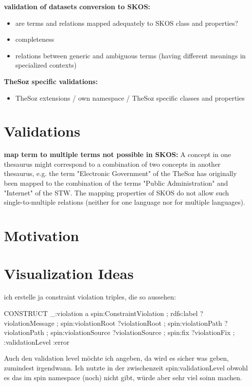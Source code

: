 \documentclass{llncs}
\begin{document}
\textbf{validation of datasets conversion to SKOS:}
\begin{itemize}
	\item are terms and relations mapped adequately to SKOS class and properties? 
	\item completeness
	\item relations between generic and ambiguous terms (having different meanings in specialized contexts) 
\end{itemize}

\textbf{TheSoz specific validations:}
\begin{itemize}
	\item TheSoz extensions / own namespace / TheSoz specific classes and properties
\end{itemize}

\section{Validations}

\textbf{map term to multiple terms not possible in SKOS:}
A concept in one thesaurus
might correspond to a combination of two concepts in
another thesaurus, e.g. the term "Electronic Government" of the TheSoz has originally been mapped to
the combination of the terms "Public Administration"
and "Internet" of the STW. The mapping properties of
SKOS do not allow such single-to-multiple relations
(neither for one language nor for multiple languages).

\section{Motivation}

\section{Visualization Ideas}

ich erstelle ja constraint violation triples, die so aussehen:

\begin{ex}
CONSTRUCT {
    _:violation
        a spin:ConstraintViolation ;
        rdfs:label ?violationMessage ;
        spin:violationRoot ?violationRoot ;
        spin:violationPath ?violationPath ;
        spin:violationSource ?violationSource ;
        spin:fix ?violationFix ;
        :validationLevel :error }
\end{ex}

Auch den validation level möchte ich angeben, da wird es sicher was geben, zumindest irgendwann.
Ich nutzte in der zwischenzeit spin:validationLevel obwohl es das im spin namespace (noch) nicht gibt, würde aber sehr viel soinn machen.
\end{document}
